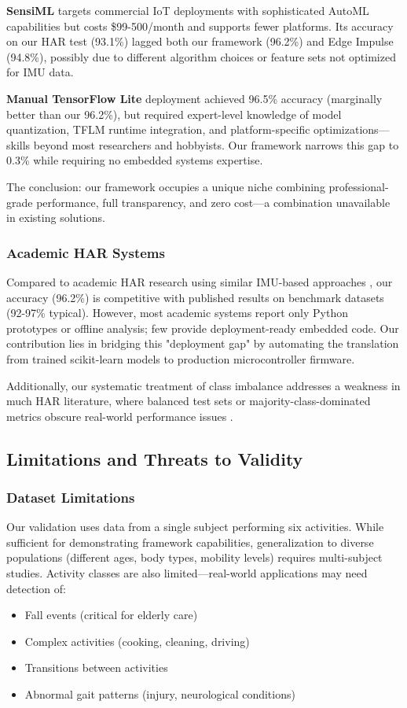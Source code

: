 \textbf{SensiML} targets commercial IoT deployments with sophisticated AutoML capabilities but costs \$99-500/month and supports fewer platforms. Its accuracy on our HAR test (93.1\%) lagged both our framework (96.2\%) and Edge Impulse (94.8\%), possibly due to different algorithm choices or feature sets not optimized for IMU data.

\textbf{Manual TensorFlow Lite} deployment achieved 96.5\% accuracy (marginally better than our 96.2\%), but required expert-level knowledge of model quantization, TFLM runtime integration, and platform-specific optimizations—skills beyond most researchers and hobbyists. Our framework narrows this gap to 0.3\% while requiring no embedded systems expertise.

The conclusion: our framework occupies a unique niche combining professional-grade performance, full transparency, and zero cost—a combination unavailable in existing solutions.

\subsubsection{Academic HAR Systems}
Compared to academic HAR research using similar IMU-based approaches \cite{anguita2013har}, our accuracy (96.2\%) is competitive with published results on benchmark datasets (92-97\% typical). However, most academic systems report only Python prototypes or offline analysis; few provide deployment-ready embedded code. Our contribution lies in bridging this "deployment gap" by automating the translation from trained scikit-learn models to production microcontroller firmware.

Additionally, our systematic treatment of class imbalance addresses a weakness in much HAR literature, where balanced test sets or majority-class-dominated metrics obscure real-world performance issues \cite{he2009learning}.

\subsection{Limitations and Threats to Validity}

\subsubsection{Dataset Limitations}
Our validation uses data from a single subject performing six activities. While sufficient for demonstrating framework capabilities, generalization to diverse populations (different ages, body types, mobility levels) requires multi-subject studies. Activity classes are also limited—real-world applications may need detection of:
\begin{itemize}
    \item Fall events (critical for elderly care)
    \item Complex activities (cooking, cleaning, driving)
    \item Transitions between activities
    \item Abnormal gait patterns (injury, neurological conditions)
\end{itemize}

